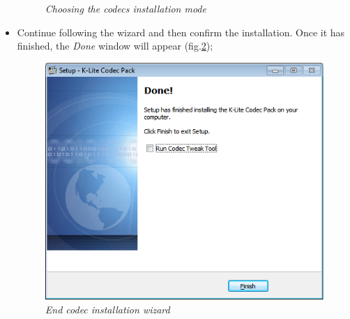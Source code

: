 \begin{itemize}
\begin{figure}[!h]
\begin{center}
\caption{\textit{Choosing the codecs installation mode}}
\label{codecmode}
\end{center}
\end{figure}
\pagebreak
\item Continue following the wizard and then confirm the installation. Once it has finished, the \textit{Done} window will appear (fig.\ref{finish_codec});
\begin{figure}[!h]
\begin{center}
\includegraphics[scale=0.7]{./Images/codec_finish}
\caption{\textit{End codec installation wizard}}
\label{finish_codec}
\end{center}
\end{figure}
\end{itemize}

